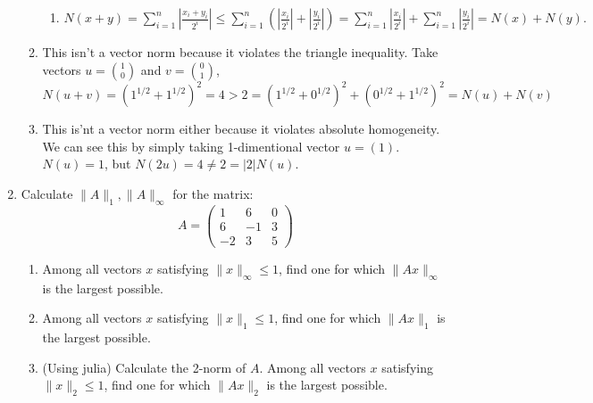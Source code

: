 \documentclass[11pt]{article}
\begin{document}
\begin{enumerate}
\begin{enumerate}[label=(\alph*)]
\begin{enumerate}
			            \item \(N(x+y) = \displaystyle\sum_{i=1}^{n} \left| \frac{x_i + y_i}{2^i} \right| \leq \sum_{i=1}^n \left( \left| \frac{x_i}{2^i} \right| + \left| \frac{y_i}{2^i} \right| \right) = \sum_{i=1}^n \left| \frac{x_i}{2^i} \right| + \sum_{i=1}^n \left| \frac{y_i}{2^i} \right| = N(x) + N(y).\)
		            \end{enumerate}
		      \item This isn't a vector norm because it violates the triangle inequality.  Take vectors \(u = \binom10\) and \(v = \binom01\),
		            \[N(u+v) = \left(1^{1/2} + 1^{1/2}\right)^2 = 4 > 2 = \left(1^{1/2} + 0^{1/2}\right)^2 + \left(0^{1/2} + 1^{1/2}\right)^2 = N(u) + N(v)\]
		      \item This is'nt a vector norm either because it violates absolute homogeneity.  We can see this by simply taking 1-dimentional vector \(u = (1)\).  \(N(u) = 1\), but \(N(2u) = 4 \neq 2 = |2|N(u)\).
	      \end{enumerate}

	\item Calculate \(\lVert A \rVert_1, \lVert A \rVert_\infty\) for the matrix:
	      \[A = \begin{pmatrix} 1 & 6 & 0 \\ 6 & -1 & 3 \\ -2 & 3 & 5 \end{pmatrix}\]
	      \begin{enumerate}[label=(\alph*)]
		      \item Among all vectors \(x\) satisfying \(\lVert x \rVert_\infty \leq 1\), find one for which \(\lVert Ax \rVert_\infty\) is the largest possible.
		      \item Among all vectors \(x\) satisfying \(\lVert x \rVert_1 \leq 1\), find one for which \(\lVert Ax \rVert_1\) is the largest possible.
		      \item (Using julia) Calculate the 2-norm of \(A\).  Among all vectors \(x\) satisfying \(\lVert x \rVert_2 \leq 1\), find one for which \(\lVert Ax \rVert_2\) is the largest possible.
	      \end{enumerate}


\end{enumerate}
\end{document}
